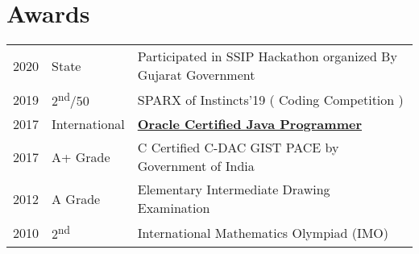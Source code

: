 \documentclass[]{deedy-resume-openfont}
\begin{document}
\begin{minipage}[t]{0.66\textwidth}


\section{Awards} 
\begin{tabular}{rll}
2020	  &State    & Participated in SSIP Hackathon organized By Gujarat Government\\
2019	  &2\textsuperscript{nd}/50   & SPARX of Instincts’19 ( Coding Competition ) \\
2017	     & International  & \href{https://www.credly.com/badges/f9998842-1285-4c07-a515-8f45c765866c/linked_in_profile}{\bf Oracle Certified Java Programmer}\\
2017     & A+ Grade  & C Certified C-DAC GIST PACE by Government of India  \\
2012     & A Grade  & Elementary Intermediate Drawing Examination\\
2010     & 2\textsuperscript{nd} & International Mathematics Olympiad (IMO) \\
\end{tabular}
\sectionsep


% 
% 

\end{minipage} 
\end{document}
